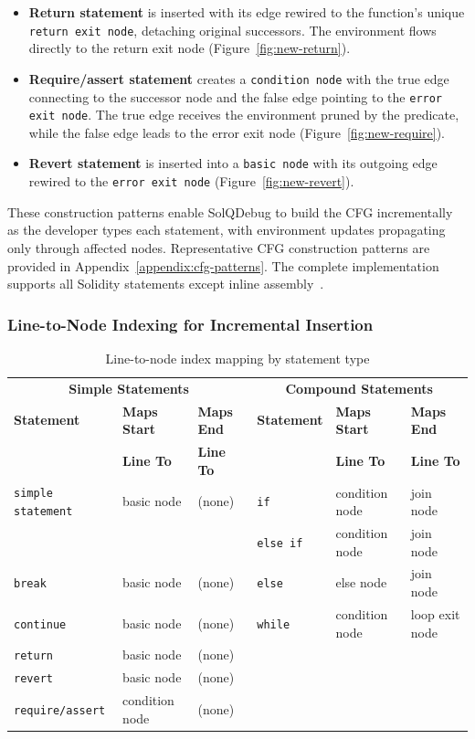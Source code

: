 \documentclass[pdflatex,sn-basic]{sn-jnl}%
\theoremstyle{thmstyleone}%
\theoremstyle{thmstyletwo}%
\theoremstyle{thmstylethree}%
\begin{document}
\begin{itemize}
  \item \textbf{Return statement} is inserted with its edge rewired to the function's unique \texttt{return exit node}, detaching original successors.
        The environment flows directly to the return exit node (Figure~\ref{fig:new-return}).

  \item \textbf{Require/assert statement} creates a \texttt{condition node} with the true edge connecting to the successor node and the false edge pointing to the \texttt{error exit node}.
        The true edge receives the environment pruned by the predicate, while the false edge leads to the error exit node (Figure~\ref{fig:new-require}).

  \item \textbf{Revert statement} is inserted into a \texttt{basic node} with its outgoing edge rewired to the \texttt{error exit node} (Figure~\ref{fig:new-revert}).
\end{itemize}

These construction patterns enable SolQDebug to build the CFG incrementally as the developer types each statement, with environment updates propagating only through affected nodes.
Representative CFG construction patterns are provided in Appendix~\ref{appendix:cfg-patterns}.
The complete implementation supports all Solidity statements except inline assembly~\citep{solqimpl}.

\subsubsection{Line-to-Node Indexing for Incremental Insertion}
\begin{table}[t!]
\centering
\caption{Line-to-node index mapping by statement type}
\label{tab:line-mapping}
\small
\begin{tabular}{@{}lll|lll@{}}
\toprule
\multicolumn{3}{c|}{\textbf{Simple Statements}} & \multicolumn{3}{c}{\textbf{Compound Statements}} \\
\textbf{Statement} & \textbf{Maps Start} & \textbf{Maps End} & \textbf{Statement} & \textbf{Maps Start} & \textbf{Maps End} \\
 & \textbf{Line To} & \textbf{Line To} &  & \textbf{Line To} & \textbf{Line To} \\
\midrule
\texttt{simple statement} & basic node & (none) & \texttt{if} & condition node & join node \\
 & & & \texttt{else if} & condition node & join node \\
\texttt{break} & basic node & (none) & \texttt{else} & else node & join node \\
\texttt{continue} & basic node & (none) & \texttt{while} & condition node & loop exit node \\
\texttt{return} & basic node & (none) & & & \\
\texttt{revert} & basic node & (none) & & & \\
\texttt{require/assert} & condition node & (none) & & & \\
\bottomrule
\end{tabular}
\end{table}
\end{document}
